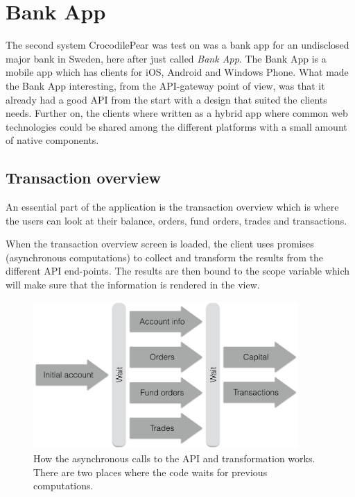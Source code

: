 \documentclass{cslthse-msc}
\begin{document}
\newpage
\section{Bank App}
The second system CrocodilePear was test on was a bank app for an undisclosed major bank in Sweden, here after just called \textit{Bank App}. The Bank App is a mobile app which has clients for iOS, Android and Windows Phone. What made the Bank App interesting, from the API-gateway point of view, was that it already had a good API from the start with a design that suited the clients needs. Further on, the clients where written as a hybrid app where common web technologies could be shared among the different platforms with a small amount of native components.

\subsection{Transaction overview}
An essential part of the application is the transaction overview which is where the users can look at their balance, orders, fund orders, trades and transactions.

When the transaction overview screen is loaded, the client uses promises (asynchronous computations) to collect and transform the results from the different API end-points. The results are then bound to the scope variable which will make sure that the information is rendered in the view.

\begin{figure}[H]
  \centering
    \begin{center}
      \includegraphics[width=0.9\textwidth]{images/bank_overview.png}
    \end{center}
  \caption{How the asynchronous calls to the API and transformation works. There are two places where the code waits for previous computations.}
\end{figure}
\end{document}
